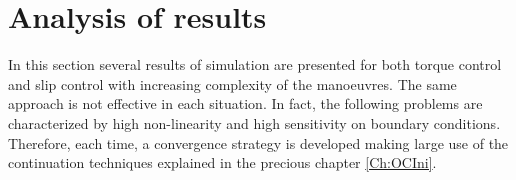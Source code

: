 \chapter{Analysis of results}
\label{Ch:Results}
In this section several results of simulation are presented for both torque control and slip control with increasing complexity of the manoeuvres. The same approach is not effective in each situation. In fact, the following problems are characterized by high non-linearity and high sensitivity on boundary conditions. Therefore, each time, a convergence strategy is developed making large use of the continuation techniques explained in the precious chapter \ref{Ch:OCIni}.    
%






%